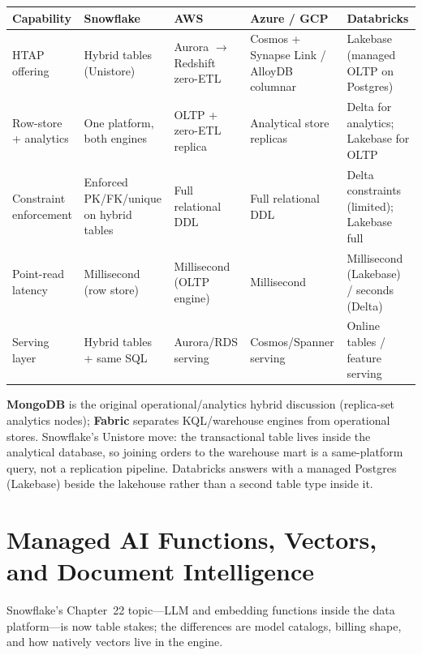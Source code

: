\begin{center}
\footnotesize
\begin{tabular}{@{}p{2.5cm}p{2.9cm}p{2.7cm}p{2.9cm}p{2.9cm}@{}}
\toprule
\textbf{Capability} & \textbf{Snowflake} & \textbf{AWS} & \textbf{Azure / GCP} & \textbf{Databricks} \\
\midrule
HTAP offering & Hybrid tables (Unistore) & Aurora $\rightarrow$ Redshift zero-ETL & Cosmos + Synapse Link / AlloyDB columnar & Lakebase (managed OLTP on Postgres) \\
Row-store + analytics & One platform, both engines & OLTP + zero-ETL replica & Analytical store replicas & Delta for analytics; Lakebase for OLTP \\
Constraint enforcement & Enforced PK/FK/unique on hybrid tables & Full relational DDL & Full relational DDL & Delta constraints (limited); Lakebase full \\
Point-read latency & Millisecond (row store) & Millisecond (OLTP engine) & Millisecond & Millisecond (Lakebase) / seconds (Delta) \\
Serving layer & Hybrid tables + same SQL & Aurora/RDS serving & Cosmos/Spanner serving & Online tables / feature serving \\
\bottomrule
\end{tabular}
\end{center}

\noindent \textbf{MongoDB} is the original operational/analytics hybrid discussion (replica-set
analytics nodes); \textbf{Fabric} separates KQL/warehouse engines from operational stores.
Snowflake's Unistore move: the transactional table lives inside the analytical database, so
joining orders to the warehouse mart is a same-platform query, not a replication pipeline.
Databricks answers with a managed Postgres (Lakebase) beside the lakehouse rather than a second
table type inside it.

\section{Managed AI Functions, Vectors, and Document Intelligence}
%
Snowflake's Chapter~22 topic---LLM and embedding functions inside the data platform---is now
table stakes; the differences are model catalogs, billing shape, and how natively vectors live
in the engine.

